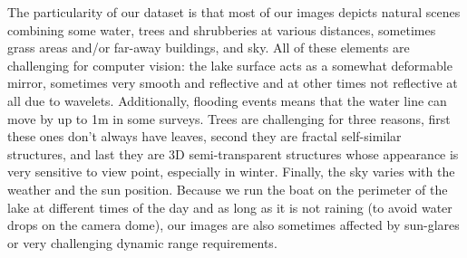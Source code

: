The particularity of our dataset is that most of our images depicts natural
scenes combining some water, trees and shrubberies at various distances,
sometimes grass areas and/or far-away buildings, and sky. All of these elements
are challenging for computer vision: the lake surface acts as a somewhat
deformable mirror, sometimes very smooth and reflective and at other times not
reflective at all due to wavelets. Additionally, flooding events means that the
water line can move by up to 1m in some surveys. Trees are challenging for
three reasons, first these ones don't always have leaves, second they are
fractal self-similar structures, and last they are 3D semi-transparent
structures whose appearance is very sensitive to view point, especially in
winter. Finally, the sky varies with the weather and the sun position. Because
we run the boat on the perimeter of the lake at different times of the day and
as long as it is not raining (to avoid water drops on the camera dome), our
images are also sometimes affected by sun-glares or very challenging dynamic
range requirements. 


